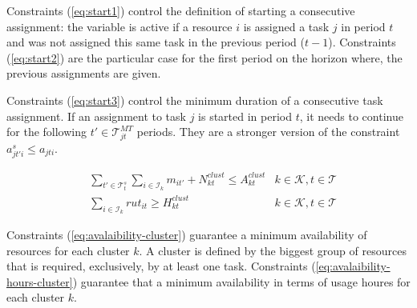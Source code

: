 \documentclass[a4paper,onecolumn,fleqn]{article}
\begin{document}
    Constraints (\ref{eq:start1}) control the definition of starting a consecutive assignment: the variable is active if a resource $i$ is assigned a task $j$ in period $t$ and was not assigned this same task in the previous period ($t-1$). Constraints (\ref{eq:start2}) are the particular case for the first period on the horizon where, the previous assignments are given.

    Constraints (\ref{eq:start3}) control the minimum duration of a consecutive task assignment. If an assignment to task $j$ is started in period $t$, it needs to continue for the following $t' \in \mathcal{T}^{MT}_{jt}$ periods. They are a stronger version of the constraint $ a^s_{jt'i} \leq a_{jti}$.

    \begin{align}
       & \sum_{t' \in \mathcal{T}^{s}_t} \sum_{i \in \mathcal{I}_k} m_{it'} + N^{clust}_{kt} \leq A^{clust}_{kt}
        &k \in \mathcal{K}, t \in \mathcal{T} \label{eq:avalaibility-cluster} \\
       & \sum_{i \in \mathcal{I}_k} rut_{it} \geq H^{clust}_{kt}
        &k \in \mathcal{K}, t \in \mathcal{T} \label{eq:avalaibility-hours-cluster}
    \end{align}

    Constraints (\ref{eq:avalaibility-cluster}) guarantee a minimum availability of resources for each cluster $k$. A cluster is defined by the biggest group of resources that is required, exclusively, by at least one task. Constraints (\ref{eq:avalaibility-hours-cluster}) guarantee that a minimum availability in terms of usage houres for each cluster $k$.
\end{document}
